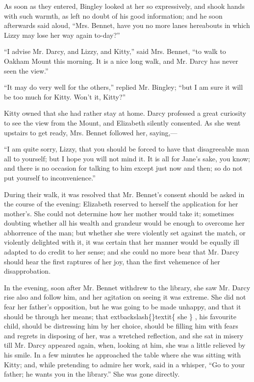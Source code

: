 \documentclass[10pt]{book}
\begin{document}
   As soon as they entered, Bingley looked at her so expressively, and
shook hands with such warmth, as left no doubt of his good information;
and he soon afterwards said aloud, “Mrs. Bennet, have you no more lanes
hereabouts in which Lizzy may lose her way again to-day?”
  

   “I advise Mr. Darcy, and Lizzy, and Kitty,” said Mrs.
   Bennet, “to walk
to Oakham Mount this morning. It is a nice long walk, and Mr. Darcy has
never seen the view.”
  

   “It may do very well for the others,” replied Mr. Bingley; “but I am
sure it will be too much for Kitty. Won’t it, Kitty?”
  

   Kitty owned that she had rather stay at home. Darcy professed a great
curiosity to see the view from the Mount, and Elizabeth silently
consented. As she went upstairs to get ready, Mrs. Bennet followed her,
saying,—
  

   “I am quite sorry, Lizzy, that you should be forced to have that
disagreeable man all to yourself; but I hope you will not mind it. It is
all for Jane’s sake, you know; and there is no occasion for talking to
him except just now and then; so do not put yourself to inconvenience.”
  

   During their walk, it was resolved that Mr. Bennet’s consent should be
asked in the course of the evening: Elizabeth reserved to herself the
application for her mother’s. She could not determine how her mother
would take it; sometimes doubting whether all his wealth and grandeur
would be enough to overcome her abhorrence of the man; but whether she
were violently set against the match, or violently delighted with it, it
was certain that her manner would be equally ill adapted to do credit to
her sense; and she could no more bear that Mr. Darcy should hear the
first raptures of her joy, than the first vehemence of her
disapprobation.
  

   In the evening, soon after Mr. Bennet withdrew to the library, she saw
Mr. Darcy rise also and follow him, and her agitation on seeing it was
extreme. She did not fear her father’s opposition, but he was going to
be made unhappy, and that it should be through her means; that
   	extbackslash\{\}textit\{
    she
   \}
   ,
his favourite child, should be distressing him by her choice, should be
filling him with fears and regrets in
   disposing of her, was a wretched
reflection, and she sat in misery till Mr. Darcy appeared again, when,
looking at him, she was a little relieved by his smile. In a few minutes
he approached the table where she was sitting with Kitty; and, while
pretending to admire her work, said in a whisper, “Go to your father; he
wants you in the library.” She was gone directly.
  
\end{document}
